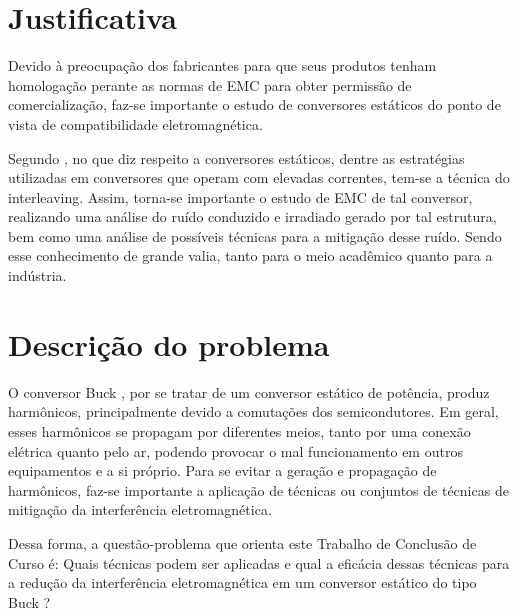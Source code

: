     \section{Justificativa}
        
        Devido à preocupação dos fabricantes para que seus produtos tenham homologação perante as normas de EMC para obter permissão de comercialização, faz-se importante o estudo de conversores estáticos do ponto de vista de compatibilidade eletromagnética.
        
        Segundo , no que diz respeito a conversores estáticos, dentre as estratégias utilizadas em conversores que operam com elevadas correntes, tem-se a técnica do interleaving. Assim, torna-se importante o estudo de EMC de tal conversor, realizando uma análise do ruído conduzido e irradiado gerado por tal estrutura, bem como uma análise de possíveis técnicas para a mitigação desse ruído.
        Sendo esse conhecimento de grande valia, tanto para o meio acadêmico quanto para a indústria.
        
    \section{Descrição do problema}
        
        O conversor Buck \interleaved, por se tratar de um conversor estático de potência, produz harmônicos, principalmente devido a comutações dos semicondutores. Em geral, esses harmônicos se propagam por diferentes meios, tanto por uma conexão elétrica quanto pelo ar, podendo provocar o mal funcionamento em outros equipamentos e a si próprio. Para se evitar a geração e propagação de harmônicos, faz-se importante a aplicação de técnicas ou conjuntos de técnicas de mitigação da interferência eletromagnética.
        
        Dessa forma, a questão-problema que orienta este Trabalho de Conclusão de Curso é: Quais técnicas podem ser aplicadas e qual a eficácia dessas técnicas para a redução da interferência eletromagnética em um conversor estático do tipo Buck \interleaved?
        
    
